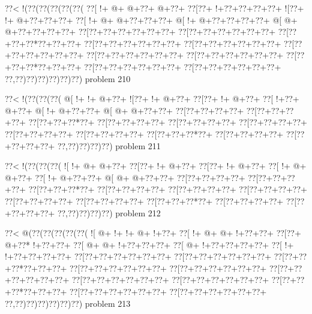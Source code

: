 \vbox{\vbox{\goo
\0??<\- !(\0??(\0??(\0??(\0??(\0??(
\0??[\- !+\- @+\- @+\0??+\- @+\0??+
\0??[\0??+\- !+\0??+\0??+\0??+\0??+
\- ![\0??+\- !+\- @+\0??+\0??+\0??+
\0??[\- !+\- @+\- @+\0??+\0??+\0??+
\- @[\- !+\- @+\0??+\0??+\0??+\0??+
\- @[\- @+\- @+\0??+\0??+\0??+\0??+
\0??[\0??+\0??+\0??+\0??+\0??+\0??+
\0??[\0??+\0??+\0??+\0??+\0??+\0??+
\0??[\0??+\0??+\0??*\0??+\0??+\0??+
\0??[\0??+\0??+\0??+\0??+\0??+\0??+
\0??[\0??+\0??+\0??+\0??+\0??+\0??+
\0??[\0??+\0??+\0??+\0??+\0??+\0??+
\0??[\0??+\0??+\0??+\0??+\0??+\0??+
\0??[\0??+\0??+\0??+\0??+\0??+\0??+
\0??[\0??+\0??+\0??*\0??+\0??+\0??+
\0??[\0??+\0??+\0??+\0??+\0??+\0??+
\0??[\0??+\0??+\0??+\0??+\0??+\0??+
\0??,\0??)\0??)\0??)\0??)\0??)\0??)
}
\hfil problem 210\hfil\break
}

\vbox{\vbox{\goo
\0??<\- !(\0??(\0??(\0??(
\- @[\- !+\- !+\- @+\0??+
\- ![\0??+\- !+\- @+\0??+
\0??[\0??+\- !+\- @+\0??+
\0??[\- !+\0??+\- @+\0??+
\- @[\- !+\- @+\0??+\0??+
\- @[\- @+\- @+\0??+\0??+
\0??[\0??+\0??+\0??+\0??+
\0??[\0??+\0??+\0??+\0??+
\0??[\0??+\0??+\0??*\0??+
\0??[\0??+\0??+\0??+\0??+
\0??[\0??+\0??+\0??+\0??+
\0??[\0??+\0??+\0??+\0??+
\0??[\0??+\0??+\0??+\0??+
\0??[\0??+\0??+\0??+\0??+
\0??[\0??+\0??+\0??*\0??+
\0??[\0??+\0??+\0??+\0??+
\0??[\0??+\0??+\0??+\0??+
\0??,\0??)\0??)\0??)\0??)
}
\hfil problem 211\hfil\break
}

\vbox{\vbox{\goo
\0??<\- !(\0??(\0??(\0??(
\- ![\- !+\- @+\- @+\0??+
\0??[\0??+\- !+\- @+\0??+
\0??[\0??+\- !+\- @+\0??+
\0??[\- !+\- @+\- @+\0??+
\0??[\- !+\- @+\0??+\0??+
\- @[\- @+\- @+\0??+\0??+
\0??[\0??+\0??+\0??+\0??+
\0??[\0??+\0??+\0??+\0??+
\0??[\0??+\0??+\0??*\0??+
\0??[\0??+\0??+\0??+\0??+
\0??[\0??+\0??+\0??+\0??+
\0??[\0??+\0??+\0??+\0??+
\0??[\0??+\0??+\0??+\0??+
\0??[\0??+\0??+\0??+\0??+
\0??[\0??+\0??+\0??*\0??+
\0??[\0??+\0??+\0??+\0??+
\0??[\0??+\0??+\0??+\0??+
\0??,\0??)\0??)\0??)\0??)
}
\hfil problem 212\hfil\break
}

\vbox{\vbox{\goo
\0??<\- @(\0??(\0??(\0??(\0??(\0??(
\- ![\- @+\- !+\- !+\- @+\- !+\0??+
\0??[\- !+\- @+\- @+\- !+\0??+\0??+
\0??[\0??+\- @+\0??*\- !+\0??+\0??+
\0??[\- @+\- @+\- !+\0??+\0??+\0??+
\0??[\- @+\- !+\0??+\0??+\0??+\0??+
\0??[\- !+\- !+\0??+\0??+\0??+\0??+
\0??[\0??+\0??+\0??+\0??+\0??+\0??+
\0??[\0??+\0??+\0??+\0??+\0??+\0??+
\0??[\0??+\0??+\0??*\0??+\0??+\0??+
\0??[\0??+\0??+\0??+\0??+\0??+\0??+
\0??[\0??+\0??+\0??+\0??+\0??+\0??+
\0??[\0??+\0??+\0??+\0??+\0??+\0??+
\0??[\0??+\0??+\0??+\0??+\0??+\0??+
\0??[\0??+\0??+\0??+\0??+\0??+\0??+
\0??[\0??+\0??+\0??*\0??+\0??+\0??+
\0??[\0??+\0??+\0??+\0??+\0??+\0??+
\0??[\0??+\0??+\0??+\0??+\0??+\0??+
\0??,\0??)\0??)\0??)\0??)\0??)\0??)
}
\hfil problem 213\hfil\break
}

